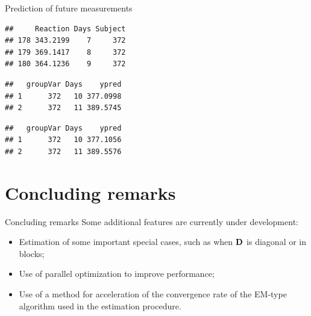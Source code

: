 \begin{frame}[fragile]{Prediction of future measurements}
\protect\hypertarget{prediction-of-future-measurements}{}

\scriptsize

\begin{Shaded}
\begin{Highlighting}[]
\NormalTok{)}
\end{Highlighting}
\end{Shaded}

\begin{verbatim}
##     Reaction Days Subject
## 178 343.2199    7     372
## 179 369.1417    8     372
## 180 364.1236    9     372
\end{verbatim}

\begin{Shaded}
\begin{Highlighting}[]
\StringTok{ }\NormalTok{(}\NormalTok{,}\OperatorTok{:}\NormalTok{,}\NormalTok{)}
\end{Highlighting}
\end{Shaded}

\begin{verbatim}
##   groupVar Days    ypred
## 1      372   10 377.0998
## 2      372   11 389.5745
\end{verbatim}

\begin{Shaded}
\begin{Highlighting}[]
\end{Highlighting}
\end{Shaded}

\begin{verbatim}
##   groupVar Days    ypred
## 1      372   10 377.1056
## 2      372   11 389.5576
\end{verbatim}

\end{frame}

\section{Concluding remarks}
\begin{frame}{Concluding remarks}
    Some additional features are currently under development:
    \begin{itemize}
        \item Estimation of some important special cases, such as when $\mathbf{D}$ is diagonal or in blocks; 
        \item Use of parallel optimization to improve performance;
        \item Use of a method for acceleration of the convergence rate of the EM-type algorithm used in the estimation procedure. 
    \end{itemize}
\end{frame}

